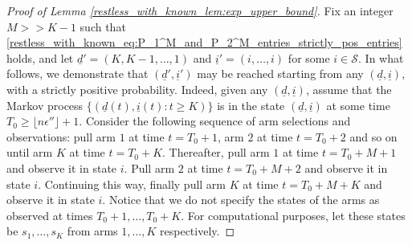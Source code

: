 \begin{proof}[Proof of Lemma \ref{restless_with_known_lem:exp_upper_bound}]
%

Fix an integer $M>> K-1$  such that \eqref{restless_with_known_eq:P_1^M_and_P_2^M_entries_strictly_pos_entries} holds, and let $\underline{d}'=(K,K-1,\ldots,1)$ and $\underline{i}'=(i,\ldots,i)$ for some $i\in \mathcal{S}$. In what follows, we demonstrate that $(\underline{d}', \underline{i}')$ may be reached starting from any $(\underline{d}, \underline{i})$, with a strictly positive probability. 
Indeed, given any $(\underline{d}, \underline{i})$, assume that the Markov process $\{(\underline{d}(t), \underline{i}(t):t\geq K)\}$ is in the state $(\underline{d}, \underline{i})$ at some time $T_0\geq \lfloor n\epsilon'' \rfloor + 1$. Consider the following sequence of arm selections and observations: pull arm $1$ at time $t=T_0+1$, arm $2$ at time $t=T_0+2$ and so on until arm $K$ at time $t=T_0+K$. Thereafter, pull arm $1$ at time $t=T_0+M+1$ and observe it in state $i$. Pull arm $2$ at time $t=T_0+M+2$ and observe it in state $i$. Continuing this way, finally pull arm $K$ at time $t=T_0+M+K$ and observe it in state $i$. Notice that we do not specify the states of the arms as observed at times $T_0+1, \ldots, T_0+K$. For computational purposes, let these states be $s_1, \ldots, s_K$ from arms $1, \ldots, K$ respectively. 


\end{proof}
